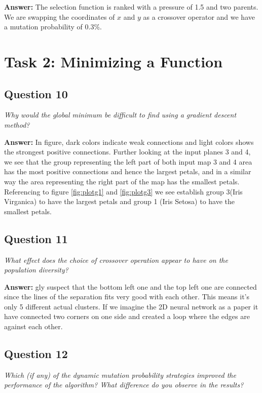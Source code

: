 \documentclass[a4paper]{article}
\begin{document}
\textbf{Answer:}  The selection function is ranked with a pressure of 1.5 and two parents. We are swapping the coordinates of $x$ and $y$ as a crossover operator and we have a mutation probability of $0.3\%$. 

\section*{Task 2: Minimizing a Function}

\subsection*{Question 10}
\emph{Why would the global minimum be difficult to find using a gradient descent method?}

\textbf{Answer:} 
In figure, dark colors indicate weak connections and light colors shows the strongest positive connections. Further looking at the input planes 3 and 4, we see that the group representing the left part of both input map 3 and 4 area has the most positive connections and hence the largest petals, and in a similar way the area representing the right part of the map has the smallest petals. Referencing to figure \ref{fig:plotg1} and \ref{fig:plotg3} we see establish group 3(Iris Virganica) to have the largest petals and group 1 (Iris Setosa) to have the smallest petals.


\subsection*{Question 11}
\emph{What effect does the choice of crossover operation appear to
have on the population diversity?}

\textbf{Answer:} gly suspect that the bottom left one and the top left one are connected since the lines of the separation fits very good with each other. This means it's only 5 different actual clusters. If we imagine the 2D neural network as a paper it have connected two corners on one side and created a loop where the edges are against each other. 
 

\subsection*{Question 12}
\emph{Which (if any) of the dynamic mutation probability strategies
improved the performance of the algorithm? What difference do you observe in the results?} 
\end{document}

